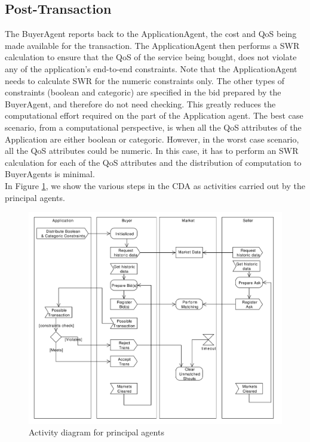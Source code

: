 \documentclass[10pt,journal,compsoc]{IEEEtran}
\begin{document}
\subsection{Post-Transaction}
The BuyerAgent reports back to the ApplicationAgent, the cost and QoS being made available for the transaction. The ApplicationAgent then performs a SWR calculation to ensure that the QoS of the service being bought, does not violate any of the application's end-to-end constraints. Note that the ApplicationAgent needs to calculate SWR for the numeric constraints only. The other types of constraints (boolean and categoric) are specified in the bid prepared by the BuyerAgent, and therefore do not need checking. This greatly reduces the computational effort required on the part of the Application agent. The best case scenario, from a computational perspective, is when all the QoS attributes of the Application are either boolean or categoric. However, in the worst case scenario, all the QoS attributes could be numeric. In this case, it has to perform an SWR calculation for each of the QoS attributes and the distribution of computation to BuyerAgents is minimal.\\

In Figure \ref{fig:cda_activity_diagram}, we show the various steps in the CDA  as activities carried out by the principal agents.
 
 \begin{figure}[h]
	\centering
	\includegraphics[scale=0.32]{drawings/CDA_Activity_Diagram.pdf}
	\caption{Activity diagram for principal agents}
	\label{fig:cda_activity_diagram}
\end{figure}	
\end{document}
